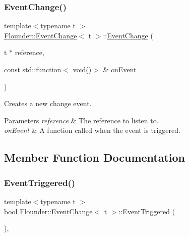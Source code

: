 \subsubsection{\texorpdfstring{Event\+Change()}{EventChange()}}
{\footnotesize\ttfamily template$<$typename t $>$ \\
\hyperlink{class_flounder_1_1_event_change}{Flounder\+::\+Event\+Change}$<$ t $>$\+::\hyperlink{class_flounder_1_1_event_change}{Event\+Change} (\begin{DoxyParamCaption}\item[{t $\ast$}]{reference,  }\item[{const std\+::function$<$ void()$>$ \&}]{on\+Event }\end{DoxyParamCaption})}



Creates a new change event. 


\begin{DoxyParams}{Parameters}
{\em reference} & The reference to listen to. \\
\hline
{\em on\+Event} & A function called when the event is triggered. \\
\hline
\end{DoxyParams}


\subsection{Member Function Documentation}
\mbox{\label{class_flounder_1_1_event_change_a1c6e0cafceb20ee7e6197e570abf17d8}} 
\subsubsection{\texorpdfstring{Event\+Triggered()}{EventTriggered()}}
{\footnotesize\ttfamily template$<$typename t $>$ \\
bool \hyperlink{class_flounder_1_1_event_change}{Flounder\+::\+Event\+Change}$<$ t $>$\+::Event\+Triggered (\begin{DoxyParamCaption}{ }\end{DoxyParamCaption})\hspace{0.3cm}{\ttfamily [override]}, {\ttfamily [virtual]}}



